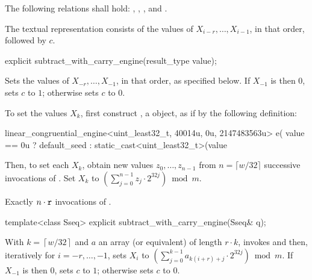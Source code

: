 \pnum
The following relations shall hold:
  ,
  ,
  ,
and
  .

\pnum
The textual representation
consists of the values of
 $X_{i-r}, \dotsc, X_{i-1}$,
in that order, followed by $c$.

%
\begin{itemdecl}
explicit subtract_with_carry_engine(result_type value);
\end{itemdecl}

\begin{itemdescr}
\pnum
\effects
 Sets the values of
 $X_{-r}, \dotsc, X_{-1}$,
 in that order, as specified below.
 If $X_{-1}$ is then $0$,
 sets $c$ to $1$;
 otherwise sets $c$ to $0$.

 To set the values $X_k$,
 first construct , a  object,
 as if by the following definition:
\begin{codeblock}
linear_congruential_engine<uint_least32_t, 40014u, 0u, 2147483563u> e(
  value == 0u ? default_seed : static_cast<uint_least32_t>(value %
\end{codeblock}
 Then, to set each $X_k$,
 obtain new values $z_0, \dotsc, z_{n-1}$
 from $n = \lceil w/32 \rceil$ successive invocations
 of .
 Set $X_k$ to $\left( \sum_{j=0}^{n-1} z_j \cdot 2^{32j}\right) \bmod m$.

\pnum
\complexity
Exactly $n \cdot \texttt{\protect r}$ invocations
 of .
\end{itemdescr}

%
\begin{itemdecl}
template<class Sseq> explicit subtract_with_carry_engine(Sseq& q);
\end{itemdecl}

\begin{itemdescr}
\pnum
\effects
 With
 $k = \left\lceil w / 32 \right\rceil$
 and $a$ an array (or equivalent)
 of length $r \cdot k$,
 invokes 
 and then, iteratively for $i = -r, \dotsc, -1$,
 sets $X_i$
 to $ \left(\sum_{j=0}^{k-1}a_{k(i+r)+j} \cdot 2^{32j} \right) \bmod m $.
 If $X_{-1}$ is then $0$,
 sets $c$ to $1$;
 otherwise sets $c$ to $0$.
\end{itemdescr}


